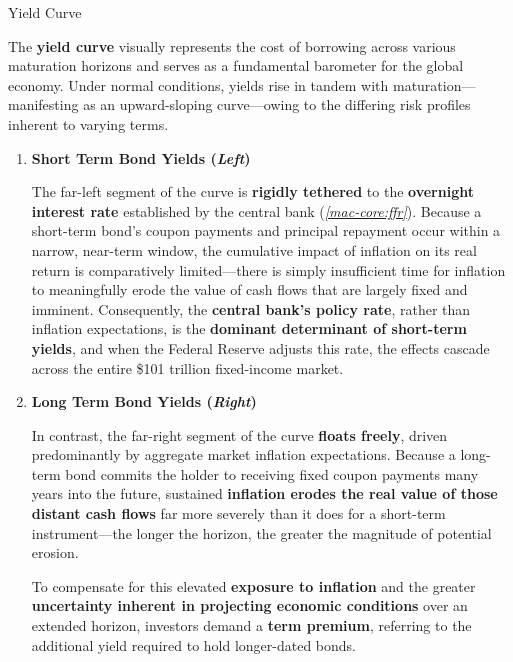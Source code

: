 \documentclass[10pt]{article}
\begin{document}
    \begin{core}[label=core:yield_curve]{Yield Curve}

      The \textbf{yield curve} visually represents the cost of borrowing across various maturation horizons and serves as a fundamental barometer for the global economy. Under normal conditions, yields rise in tandem with maturation---manifesting as an upward-sloping curve---owing to the differing risk profiles inherent to varying terms.


      \begin{enumerate}

        \item \textbf{Short Term Bond Yields (\textit{Left})}

        The far-left segment of the curve is \textbf{rigidly tethered} to the \textbf{overnight interest rate} established by the central bank (\textit{\autoref{mac-core:ffr}}). Because a short-term bond's coupon payments and principal repayment occur within a narrow, near-term window, the cumulative impact of inflation on its real return is comparatively limited---there is simply insufficient time for inflation to meaningfully erode the value of cash flows that are largely fixed and imminent. Consequently, the \textbf{central bank's policy rate}, rather than inflation expectations, is the \textbf{dominant determinant of short-term yields}, and when the Federal Reserve adjusts this rate, the effects cascade across the entire \$101 trillion fixed-income market.

        \item \textbf{Long Term Bond Yields (\textit{Right})}

        In contrast, the far-right segment of the curve \textbf{floats freely}, driven predominantly by aggregate market inflation expectations. Because a long-term bond commits the holder to receiving fixed coupon payments many years into the future, sustained \textbf{inflation erodes the real value of those distant cash flows} far more severely than it does for a short-term instrument---the longer the horizon, the greater the magnitude of potential erosion.

        To compensate for this elevated \textbf{exposure to inflation} and the greater \textbf{uncertainty inherent in projecting economic conditions} over an extended horizon, investors demand a \textbf{term premium}, referring to the additional yield required to hold longer-dated bonds.

      \end{enumerate}

    \end{core}
\end{document}
